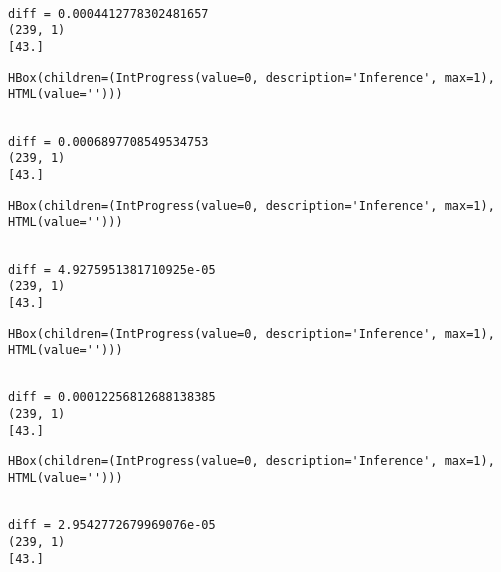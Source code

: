 \documentclass[11pt]{article}
\begin{document}
    
    \begin{Verbatim}[commandchars=\\\{\}]

diff = 0.0004412778302481657
(239, 1)
[43.]

    \end{Verbatim}

    
    \begin{verbatim}
HBox(children=(IntProgress(value=0, description='Inference', max=1), HTML(value='')))
    \end{verbatim}

    
    \begin{Verbatim}[commandchars=\\\{\}]

diff = 0.0006897708549534753
(239, 1)
[43.]

    \end{Verbatim}

    
    \begin{verbatim}
HBox(children=(IntProgress(value=0, description='Inference', max=1), HTML(value='')))
    \end{verbatim}

    
    \begin{Verbatim}[commandchars=\\\{\}]

diff = 4.9275951381710925e-05
(239, 1)
[43.]

    \end{Verbatim}

    
    \begin{verbatim}
HBox(children=(IntProgress(value=0, description='Inference', max=1), HTML(value='')))
    \end{verbatim}

    
    \begin{Verbatim}[commandchars=\\\{\}]

diff = 0.00012256812688138385
(239, 1)
[43.]

    \end{Verbatim}

    
    \begin{verbatim}
HBox(children=(IntProgress(value=0, description='Inference', max=1), HTML(value='')))
    \end{verbatim}

    
    \begin{Verbatim}[commandchars=\\\{\}]

diff = 2.9542772679969076e-05
(239, 1)
[43.]

    \end{Verbatim}
\end{document}
